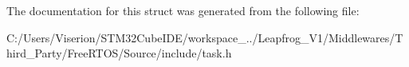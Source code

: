 The documentation for this struct was generated from the following file\+:\begin{DoxyCompactItemize}
\item 
C\+:/\+Users/\+Viserion/\+S\+T\+M32\+Cube\+I\+D\+E/workspace\+\_../\+Leapfrog\+\_\+\+V1/\+Middlewares/\+Third\+\_\+\+Party/\+Free\+R\+T\+O\+S/\+Source/include/task.\+h\end{DoxyCompactItemize}
